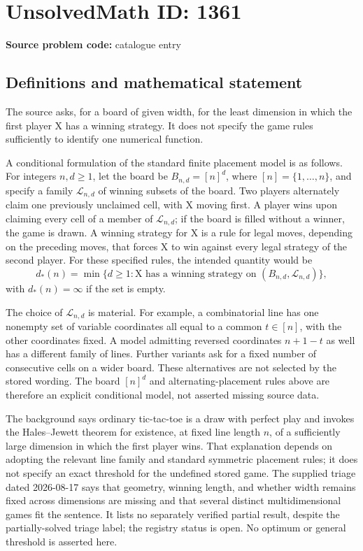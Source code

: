 \documentclass[11pt]{article}
\begin{document}
\section*{UnsolvedMath ID: 1361}
\textbf{Source problem code:} catalogue entry
\subsection{Definitions and mathematical statement}
The source asks, for a board of given width, for the least dimension in which the first player X has a winning strategy. It does not specify the game rules sufficiently to identify one numerical function.

A conditional formulation of the standard finite placement model is as follows. For integers $n,d\geq1$, let the board be $B_{n,d}=[n]^d$, where $[n]=\{1,\ldots,n\}$, and specify a family $\mathcal L_{n,d}$ of winning subsets of the board. Two players alternately claim one previously unclaimed cell, with X moving first. A player wins upon claiming every cell of a member of $\mathcal L_{n,d}$; if the board is filled without a winner, the game is drawn. A winning strategy for X is a rule for legal moves, depending on the preceding moves, that forces X to win against every legal strategy of the second player. For these specified rules, the intended quantity would be
\[
d_*(n)=\min\{d\geq1:\text{X has a winning strategy on }(B_{n,d},\mathcal L_{n,d})\},
\]
with $d_*(n)=\infty$ if the set is empty.

The choice of $\mathcal L_{n,d}$ is material. For example, a combinatorial line has one nonempty set of variable coordinates all equal to a common $t\in[n]$, with the other coordinates fixed. A model admitting reversed coordinates $n+1-t$ as well has a different family of lines. Further variants ask for a fixed number of consecutive cells on a wider board. These alternatives are not selected by the stored wording. The board $[n]^d$ and alternating-placement rules above are therefore an explicit conditional model, not asserted missing source data.

The background says ordinary tic-tac-toe is a draw with perfect play and invokes the Hales--Jewett theorem for existence, at fixed line length $n$, of a sufficiently large dimension in which the first player wins. That explanation depends on adopting the relevant line family and standard symmetric placement rules; it does not specify an exact threshold for the undefined stored game. The supplied triage dated 2026-08-17 says that geometry, winning length, and whether width remains fixed across dimensions are missing and that several distinct multidimensional games fit the sentence. It lists no separately verified partial result, despite the partially-solved triage label; the registry status is open. No optimum or general threshold is asserted here.
\end{document}
